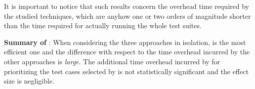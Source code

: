It is important to notice that such results concern the overhead time required by the studied techniques, which are anyhow one or two orders of magnitude shorter than the time required for actually running the whole test suites.

\begin{tcolorbox}%
\textbf{Summary of }: When considering the three approaches in isolation, \fs is the most efficient one and the difference with respect to the time overhead incurred by the other approaches is \textit{large}.
The additional time overhead incurred by \fz for prioritizing the test cases selected by \ek is not statistically significant and the effect size is negligible.
\end{tcolorbox}